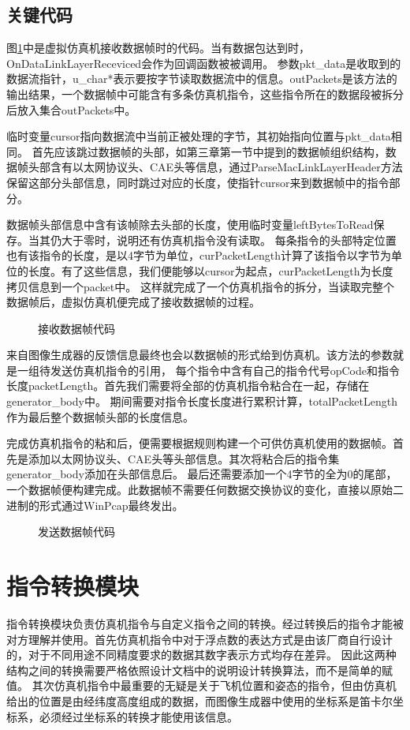 \subsection{关键代码}
图\ref{codeSimRec}中是虚拟仿真机接收数据帧时的代码。当有数据包达到时，OnDataLinkLayerReceviced会作为回调函数被被调用。
参数pkt\_data是收取到的数据流指针，u\_char*表示要按字节读取数据流中的信息。outPackets是该方法的输出结果，一个数据帧中可能含有多条仿真机指令，这些指令所在的数据段被拆分后放入集合outPackets中。
\par
临时变量cursor指向数据流中当前正被处理的字节，其初始指向位置与pkt\_data相同。
首先应该跳过数据帧的头部，如第三章第一节中提到的数据帧组织结构，数据帧头部含有以太网协议头、CAE头等信息，通过ParseMacLinkLayerHeader方法保留这部分头部信息，同时跳过对应的长度，使指针cursor来到数据帧中的指令部分。
\par
数据帧头部信息中含有该帧除去头部的长度，使用临时变量leftBytesToRead保存。当其仍大于零时，说明还有仿真机指令没有读取。
每条指令的头部特定位置也有该指令的长度，是以4字节为单位，curPacketLength计算了该指令以字节为单位的长度。有了这些信息，我们便能够以cursor为起点，curPacketLength为长度拷贝信息到一个packet中。
这样就完成了一个仿真机指令的拆分，当读取完整个数据帧后，虚拟仿真机便完成了接收数据帧的过程。
\begin{figure}[h!]
    \centering
     
    \caption{接收数据帧代码}
    \label{codeSimRec}
\end{figure}
\par
来自图像生成器的反馈信息最终也会以数据帧的形式给到仿真机。该方法的参数就是一组待发送仿真机指令的引用，
每个指令中含有自己的指令代号opCode和指令长度packetLength。首先我们需要将全部的仿真机指令粘合在一起，存储在generator\_body中。
期间需要对指令长度长度进行累积计算，totalPacketLength作为最后整个数据帧头部的长度信息。
\par
完成仿真机指令的粘和后，便需要根据规则构建一个可供仿真机使用的数据帧。首先是添加以太网协议头、CAE头等头部信息。其次将粘合后的指令集generator\_body添加在头部信息后。
最后还需要添加一个4字节的全为0的尾部，一个数据帧便构建完成。此数据帧不需要任何数据交换协议的变化，直接以原始二进制的形式通过WinPcap最终发出。
\begin{figure}[h!]
    \centering
     
    \caption{发送数据帧代码}
    \label{codeSimSend}
\end{figure}

\section{指令转换模块}
指令转换模块负责仿真机指令与自定义指令之间的转换。经过转换后的指令才能被对方理解并使用。首先仿真机指令中对于浮点数的表达方式是由该厂商自行设计的，对于不同用途不同精度要求的数据其数字表示方式均存在差异。
因此这两种结构之间的转换需要严格依照设计文档中的说明设计转换算法，而不是简单的赋值。
其次仿真机指令中最重要的无疑是关于飞机位置和姿态的指令，但由仿真机给出的位置是由经纬度高度组成的数据，而图像生成器中使用的坐标系是笛卡尔坐标系，必须经过坐标系的转换才能使用该信息。
